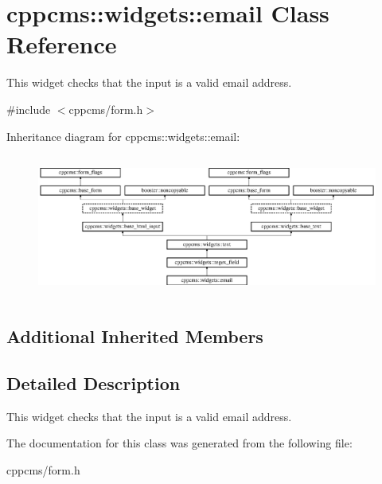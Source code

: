 \section{cppcms\-:\-:widgets\-:\-:email Class Reference}
\label{classcppcms_1_1widgets_1_1email}


This widget checks that the input is a valid email address.  




{\ttfamily \#include $<$cppcms/form.\-h$>$}

Inheritance diagram for cppcms\-:\-:widgets\-:\-:email\-:\begin{figure}[H]
\begin{center}
\leavevmode
\includegraphics[height=4.734299cm]{classcppcms_1_1widgets_1_1email}
\end{center}
\end{figure}
\subsection*{Additional Inherited Members}


\subsection{Detailed Description}
This widget checks that the input is a valid email address. 

The documentation for this class was generated from the following file\-:\begin{DoxyCompactItemize}
\item 
cppcms/form.\-h\end{DoxyCompactItemize}
